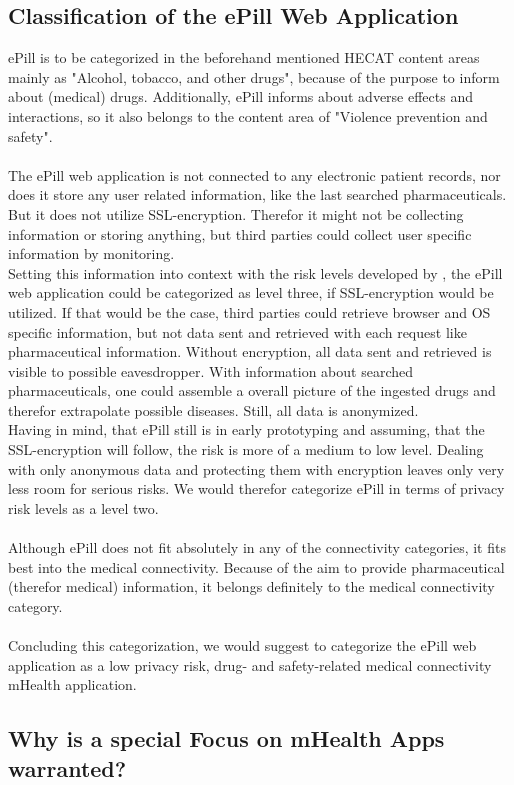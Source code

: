 \subsection{Classification of the ePill Web Application}
ePill is to be categorized in the beforehand mentioned HECAT content areas mainly as "Alcohol, tobacco, and other drugs", because of the purpose to inform about (medical) drugs. Additionally, ePill informs about adverse effects and interactions, so it also belongs to the content area of "Violence prevention and safety".
\\
\\
The ePill web application is not connected to any electronic patient records, nor does it store any user related information, like the last searched pharmaceuticals. But it does not utilize SSL-encryption. Therefor it might not be collecting information or storing anything, but third parties could collect user specific information by monitoring.
\\
Setting this information into context with the risk levels developed by \cite{Njie.2013}, the ePill web application could be categorized as level three, if SSL-encryption would be utilized. If that would be the case, third parties could retrieve browser and OS specific information, but not data sent and retrieved with each request like pharmaceutical information. Without encryption, all data sent and retrieved is visible to possible eavesdropper. With information about searched pharmaceuticals, one could assemble a overall picture of the ingested drugs and therefor extrapolate possible diseases. Still, all data is anonymized.
\\
Having in mind, that ePill still is in early prototyping and assuming, that the SSL-encryption will follow, the risk is more of a medium to low level. Dealing with only anonymous data and protecting them with encryption leaves only very less room for serious risks. We would therefor categorize ePill in terms of privacy risk levels as a level two.
\\
\\
Although ePill does not fit absolutely in any of the connectivity categories, it fits best into the medical connectivity. Because of the aim to provide pharmaceutical (therefor medical) information, it belongs definitely to the medical connectivity category.
\\
\\
Concluding this categorization, we would suggest to categorize the ePill web application as a low privacy risk, drug- and safety-related medical connectivity mHealth application.

\subsection{Why is a special Focus on mHealth Apps warranted?}